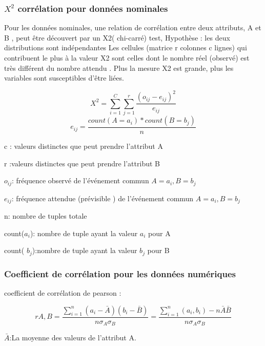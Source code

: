 \documentclass[12pt,a4paper,oneside]{book}
\begin{document}
     \subsubsection{$X^2$ corrélation pour données nominales}
     Pour les données nominales, une relation de corrélation entre deux attributs, A
     et B , peut être découvert par un X2(  chi-carré) test,
     Hypothèse : les deux distributions sont indépendantes
     Les cellules (matrice r colonnes  c lignes) qui contribuent le plus à la valeur X2 sont celles dont le nombre réel (observé) est très différent du nombre attendu .
     Plus la mesure X2 est grande, plus les variables sont susceptibles d'être liées.
     
     
     \begin{equation*}
     X^2 = \sum_{i=1}^{C}\sum_{j=1}^{r}\frac{(o_{ij}- e_{ij})^2}{e_{ij}}
     \end{equation*}
     \begin{equation*}
       e_{ij}= \frac{count(A=a_{i})* count(B=b_{j})}{n}
      \end{equation*}
    
     c : valeurs distinctes que peut prendre l'attribut A
     
     r :valeurs distinctes que peut prendre  l'attribut B
     
     $o_{ij}$: fréquence observé de l'événement commun $A=a_{i},B=b_{j}$
     
     $e_{ij}$: fréquence attendue (prévisible ) de l'événement commun $A=a_{i},B=b_{j}$
      
     n: nombre de tuples totale
      
     count($a_{i}$): nombre de tuple ayant la valeur $a_{i}$ pour A
    
     count( $b_{j}$):nombre de tuple ayant la valeur $b_{j}$ pour B
     
    \subsubsection{Coefficient de corrélation pour les données numériques} 
    coefficient de corrélation de pearson :
    
    \begin{equation*}
    r A,B= \frac{\sum_{i=1}^{n} (a_{i}-\bar{A})(b_{i}-\bar{B})}{n\sigma_{A} \sigma_{B} }= \frac{\sum_{i=1}^{n} (a_{i},b_{i})-n\bar{A}\bar{B}}{n\sigma_{A} \sigma_{B} }
    \end{equation*}
    
    $\bar{A}$:La moyenne des valeurs de l'attribut A.
    
\end{document}
